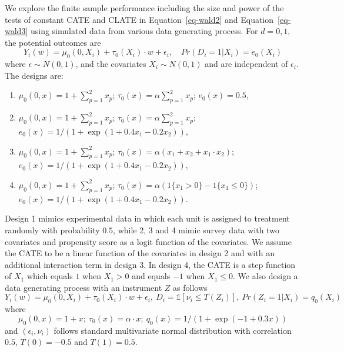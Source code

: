 \documentclass[
  12pt,
  12pt]{article}
\numberwithin{equation}{section}
\theoremstyle{definition}
\theoremstyle{plain}
\theoremstyle{plain}
\theoremstyle{remark}
\begin{document}
We explore the finite sample performance including the size and power of
the tests of constant CATE and CLATE in Equation~\ref{eq-wald2} and
Equation~\ref{eq-wald3} using simulated data from various data
generating process. For \(d = 0, 1\), the potential outcomes are \[
Y_i(w) = \mu_0(0, X_i) + \tau_0(X_i) \cdot w + \epsilon_i, \quad Pr(D_i = 1|X_i) = e_0(X_i)
\] where \(\epsilon \sim N(0, 1)\), and the covariates
\(X_i \sim N(0, 1)\) and are independent of \(\epsilon_i\). The designs
are:

\begin{enumerate}
\def\labelenumi{\arabic{enumi}.}
\item
  \(\mu_0(0, x) = 1 + \sum_{p = 1}^{2}x_p\);
  \(\tau_0(x) = \alpha \sum_{p = 1}^{2}x_p\); \(e_0(x) = 0.5\),
\item
  \(\mu_0(0, x) = 1 + \sum_{p = 1}^{2}x_p\);
  \(\tau_0(x) = \alpha \sum_{p = 1}^{2}x_p\);
  \(e_0(x) = 1 / (1 + \exp(1 + 0.4x_1 - 0.2x_2))\),
\item
  \(\mu_0(0, x) = 1 + \sum_{p = 1}^{2}x_p\);
  \(\tau_0(x) = \alpha (x_1 + x_2 + x_1 \cdot x_2)\);
  \(e_0(x) = 1 / (1 + \exp(1 + 0.4x_1 - 0.2x_2))\),
\item
  \(\mu_0(0, x) = 1 + \sum_{p = 1}^{2}x_p\);
  \(\tau_0(x) = \alpha(1\{x_1 > 0\} - 1\{x_1 \leqslant 0\})\);
  \(e_0(x) = 1 / (1 + \exp(1 + 0.4x_1 - 0.2x_2))\).
\end{enumerate}

Design 1 mimics experimental data in which each unit is assigned to
treatment randomly with probability \(0.5\), while 2, 3 and 4 mimic
survey data with two covariates and propensity score as a logit function
of the covariates. We assume the CATE to be a linear function of the
covariates in design 2 and with an additional interaction term in design
3. In design 4, the CATE is a step function of \(X_1\) which equals
\(1\) when \(X_1 > 0\) and equals \(-1\) when \(X_1 \leqslant 0\). We
also design a data generating process with an instrument \(Z\) as
follows \[
Y_i(w) = \mu_0(0, X_i) + \tau_0(X_i) \cdot w + \epsilon_i, \  D_i = \mathds{1}[\nu_i \leqslant T(Z_i)], \  Pr(Z_i = 1|X_i) = q_0(X_i)
\] where \[
\mu_0(0, x) = 1 + x; \ \tau_0(x) = \alpha \cdot x; \ q_0(x) = 1 / (1 + \exp(-1 + 0.3x))
\] and \((\epsilon_i, \nu_i)\) follows standard multivariate normal
distribution with correlation \(0.5\), \(T(0) = -0.5\) and
\(T(1) = 0.5\).
\end{document}
